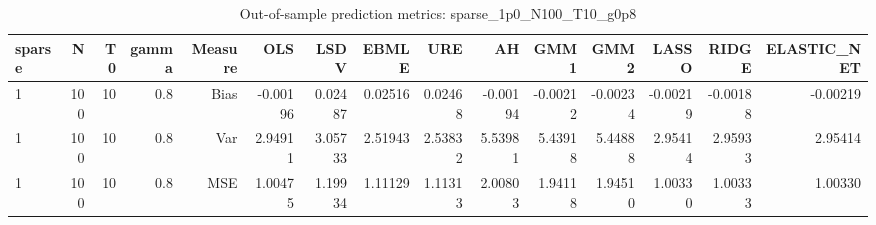 \begin{table}[!htbp]\centering
\caption{Out-of-sample prediction metrics: sparse_1p0_N100_T10_g0p8}
\label{tab:table3_sparse_1p0_N100_T10_g0p8}
\begin{tabular}{lrrrrrrrrrrrrrr}
\hline
sparse & N & T0 & gamma & Measure & OLS & LSDV & EBMLE & URE & AH & GMM1 & GMM2 & LASSO & RIDGE & ELASTIC_NET \\
\hline
1 & 100 & 10 & 0.8 & Bias & -0.00196 & 0.02487 & 0.02516 & 0.02468 & -0.00194 & -0.00212 & -0.00234 & -0.00219 & -0.00188 & -0.00219 \\
1 & 100 & 10 & 0.8 & Var & 2.94911 & 3.05733 & 2.51943 & 2.53832 & 5.53981 & 5.43918 & 5.44888 & 2.95414 & 2.95933 & 2.95414 \\
1 & 100 & 10 & 0.8 & MSE & 1.00475 & 1.19934 & 1.11129 & 1.11313 & 2.00803 & 1.94118 & 1.94510 & 1.00330 & 1.00333 & 1.00330 \\
\hline
\end{tabular}
\end{table}

